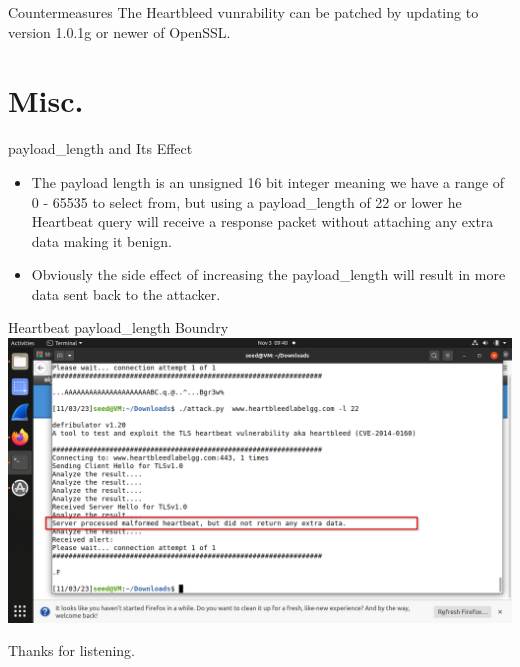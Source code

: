 \documentclass{beamer}
\begin{document}
\begin{frame}{Countermeasures}
    The Heartbleed vunrability can be patched by updating to version 1.0.1g or newer of
    OpenSSL.
\end{frame}

\section{Misc.}
\begin{frame}{payload\_length and Its Effect}
    \begin{itemize}
        \item
            The payload length is an unsigned 16 bit integer meaning we have a range of 0 - 65535
            to select from, but using a payload\_length of 22 or lower he Heartbeat query will
            receive a response packet without attaching any extra data making it benign.
        \item
            Obviously the side effect of increasing the payload\_length will result in more data
            sent back to the attacker.
    \end{itemize}
\end{frame}

\begin{frame}{Heartbeat payload\_length Boundry}
    \includegraphics[width=\textwidth]{heartbleed_boundry.png}
\end{frame}

\begin{frame}
    Thanks for listening.
\end{frame}
\end{document}
